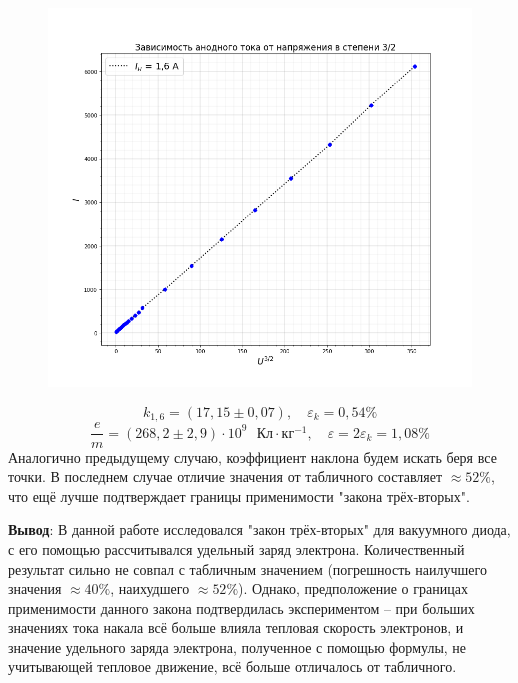 \documentclass[a4paper,12pt]{article}
\begin{document}
\begin{figure}[H]\label{fig: I)(U^3/2) 1.6}
    \centering
    \includegraphics[width = \textwidth]{I(U pow (1,5))_16.png}
\end{figure}
\[k_{1,6} = (17,15 \pm 0,07), \quad \varepsilon_k = 0,54\% \]
\[\frac{e}{m} = (268,2 \pm 2,9) \cdot 10^{9} \text{ } Кл \cdot кг^{-1}, \quad \varepsilon = 2\varepsilon_k = 1,08\%\]
Аналогично предыдущему случаю, коэффициент наклона будем искать беря все точки. В последнем случае отличие значения от табличного составляет $\approx 52\%$, что ещё лучше подтверждает границы применимости "закона трёх-вторых".


\textbf{Вывод}: В данной работе исследовался "закон трёх-вторых" для вакуумного диода, с его помощью рассчитывался удельный заряд электрона. Количественный результат сильно не совпал с табличным значением (погрешность наилучшего значения $\approx 40\%$, наихудшего $\approx 52\%$). Однако, предположение о границах применимости данного закона подтвердилась экспериментом -- при больших значениях тока накала всё больше влияла тепловая скорость электронов, и значение удельного заряда электрона, полученное с помощью формулы, не учитывающей тепловое движение, всё больше отличалось от табличного. 
\end{document}
